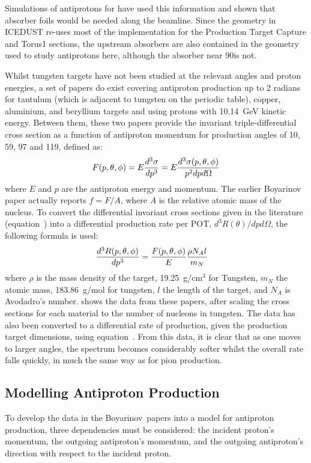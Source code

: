 Simulations of antiprotons for \phaseI have used this information and shown that absorber foils would be needed along the beamline.  
Since the \phaseII geometry in ICEDUST re-uses most of the implementation for the Production Target Capture and Torus1 sections, the upstream absorbers are also contained in the geometry used to study antiprotons here,
although the absorber near 90\degree is not.

\FigAntiprotonData
Whilst tungsten targets have not been studied at the relevant angles and proton energies, a set of papers \cite{Boyarinov:1994tp,Kiselev:2012sj} do exist covering antiproton production up to 2 radians for tantulum (which is adjacent to tungsten on the periodic table), copper, aluminium, and beryllium targets and using protons with 10.14~GeV kinetic energy.
Between them, these two papers provide the invariant triple-differential cross section as a function of antiproton momentum for production angles of 10, 59, 97 and 119\degree, defined as:
\begin{equation}
\eqlabel{bg:antiprotons:lit}
	F(p,\theta,\phi)=E \frac{d^3\sigma}{dp^3}=E\frac{d^3\sigma(p,\theta,\phi)}{p^2dpd\Omega}
\end{equation}
where $E$ and $p$ are the antiproton energy and momentum.  The earlier Boyarinov paper actually reports $f=F/A$, where $A$ is the relative atomic mass of the nucleus.
To convert the differential invariant cross sections given in the literature (equation~) into a differential production rate per \ac{POT}, $d^3R(\theta)/dpd\Omega$, the following formula is used:
\begin{align}
	\eqlabel{bg:antiprotons:rate}
	\frac{d^3R(p,\theta,\phi)}{dp^3}&=\frac{F(p,\theta,\phi)}{E}\frac{\rho N_A l}{m_N}
\end{align}
where $\rho$ is the mass density of the target, 19.25~g/cm$^3$ for Tungsten, $m_N$ the atomic mass, 183.86~g/mol for tungsten, $l$ the length of the target, and $N_A$ is Avodadro's number.
 shows the data from these papers, after scaling the cross sections for each material to the number of nucleons in tungsten.
The data has also been converted to a differential rate of production, given the \phaseII production target dimensions, using equation~.
From this data, it is clear that as one moves to larger angles, the spectrum becomes considerably softer whilst the overall rate falls quickly, in much the same way as for pion production.

\subsection{Modelling Antiproton Production}
To develop the data in the Boyarinov~\etal papers into a model for antiproton production, three dependencies must be considered:
the incident proton's momentum, the outgoing antiproton's momentum, and the outgoing antiproton's direction with respect to the incident proton.

